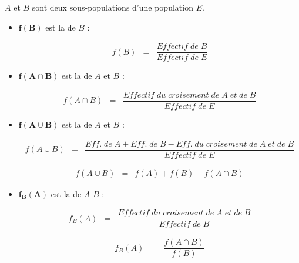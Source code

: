 \documentclass[12pt,a4paper]{article}
\begin{document}
\begin{mybilan}
	$A$ et $B$ sont deux sous-populations d'une population $E$.
	\begin{itemize}
		\item $\mathbf{f(B)}$ est la  de $B$ :
		
		\begin{eqnarray*}
			f(B) &=& \dfrac{Effectif\; de\; B }{Effectif\; de\; E}
		\end{eqnarray*}
		
		\item $\mathbf{f(A \cap B)}$ est la  de $A$ et $B$ :
		
		\begin{eqnarray*}
			f(A \cap B) &=& \dfrac{Effectif\; du\; croisement \; de\;A\; et\; de\; B }{Effectif\; de\; E}
		\end{eqnarray*}
		
		\item $\mathbf{f(A \cup B)}$ est la  de $A$ et $B$ :
		
		\begin{eqnarray*}
			f(A \cup B) &=& \dfrac{Eff.\; de\; A + Eff.\; de\; B  - Eff.\; du\; croisement \; de\;A\; et\; de\; B}{Effectif\; de\; E}
		\end{eqnarray*}
		
		\begin{eqnarray*}
			f(A \cup B) &=& f(A) + f(B) - f(A \cap B)
		\end{eqnarray*}
		
		\item $\mathbf{f_B(A)}$ est la  de $A$  $B$ :
		
		\begin{eqnarray*}
			f_B(A) &=& \dfrac{Effectif\; du\; croisement \; de\;A\; et\; de\; B }{Effectif\; de\; B}
		\end{eqnarray*}
		
		\begin{eqnarray*}
			f_B(A) &=& \dfrac{f(A \cap B)}{f(B)}
		\end{eqnarray*}
		
		
	\end{itemize}
\end{mybilan}

\end{document}
